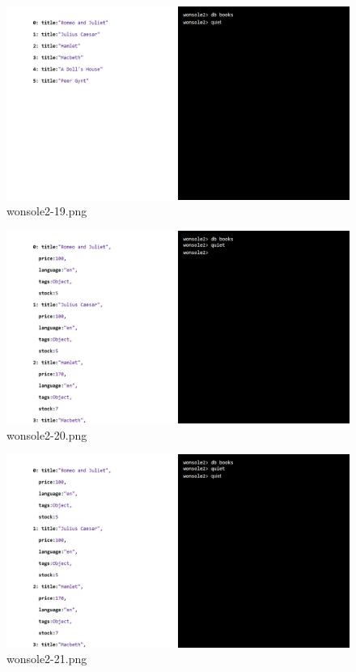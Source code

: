 \clearpage
\begin{figure}
\includegraphics[width=\textwidth]{screenshot/wonsole2/wonsole2-19.png}
\caption{wonsole2-19.png}
\label{wonsole2-19.png}
\end{figure}


\begin{figure}
\includegraphics[width=\textwidth]{screenshot/wonsole2/wonsole2-20.png}
\caption{wonsole2-20.png}
\label{wonsole2-20.png}
\end{figure}


\clearpage
\begin{figure}
\includegraphics[width=\textwidth]{screenshot/wonsole2/wonsole2-21.png}
\caption{wonsole2-21.png}
\label{wonsole2-21.png}
\end{figure}


